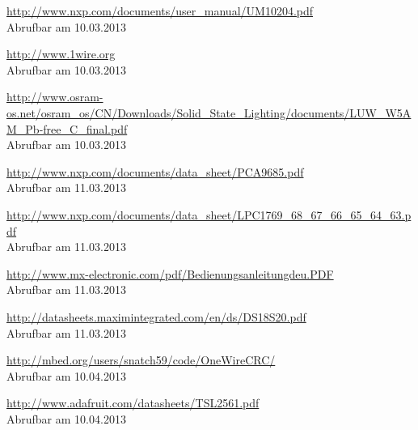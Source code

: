\documentclass[a4paper,12pt]{scrartcl}
\begin{document}
\renewcommand\refname{}
\begin{thebibliography}{999}

\url{http://www.nxp.com/documents/user_manual/UM10204.pdf}
\\Abrufbar am 10.03.2013

\url{http://www.1wire.org}
\\Abrufbar am 10.03.2013

\url{http://www.osram-os.net/osram_os/CN/Downloads/Solid_State_Lighting/documents/LUW_W5AM_Pb-free_C_final.pdf}
\\Abrufbar am 10.03.2013

\url{http://www.nxp.com/documents/data_sheet/PCA9685.pdf}
\\Abrufbar am 11.03.2013

\url{http://www.nxp.com/documents/data_sheet/LPC1769_68_67_66_65_64_63.pdf}
\\Abrufbar am 11.03.2013

\url{http://www.mx-electronic.com/pdf/Bedienungsanleitungdeu.PDF}
\\Abrufbar am 11.03.2013

\url{http://datasheets.maximintegrated.com/en/ds/DS18S20.pdf}
\\Abrufbar am 11.03.2013

\url{http://mbed.org/users/snatch59/code/OneWireCRC/}
\\Abrufbar am 10.04.2013

\url{http://www.adafruit.com/datasheets/TSL2561.pdf}
\\Abrufbar am 10.04.2013


\end{thebibliography}




\end{document}
